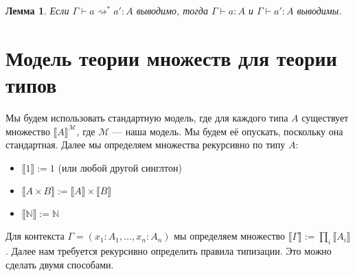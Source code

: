 \documentclass[openany]{book}
\theoremstyle{plain}
\newtheorem{lem}[thm]{Лемма}
\theoremstyle{definition}
\newcommand{\N}{\mathbb{N}}
\begin{document}
\begin{lem}
    Если \(\Gamma \vdash a \rightsquigarrow^* a' : A\) выводимо, тогда \(\Gamma \vdash a : A\) и \(\Gamma \vdash a' : A\) выводимы.
\end{lem}

\section{Модель теории множеств для теории типов}
Мы будем использовать стандартную модель, где для каждого типа \(A\) существует множество \(\llbracket A\rrbracket^\mathcal{M}\), где \(\mathcal{M}\) --- наша модель. Мы будем её опускать, поскольку она стандартная. Далее мы определяем множества рекурсивно по типу \(A\):
\begin{itemize}
    \item \(\llbracket 1 \rrbracket := 1\) (или любой другой синглтон)
    \item \(\llbracket A \times B \rrbracket := \llbracket A \rrbracket \times \llbracket B \rrbracket\)
    \item \(\llbracket \N \rrbracket := \N\)
\end{itemize}

Для контекста \(\Gamma = (x_1 : A_1, \dots, x_n : A_n)\) мы определяем множество \(\llbracket \Gamma \rrbracket := \prod_i \llbracket A_i \rrbracket\). Далее нам требуется рекурсивно определить правила типизации. Это можно сделать двумя способами. 
\end{document}
